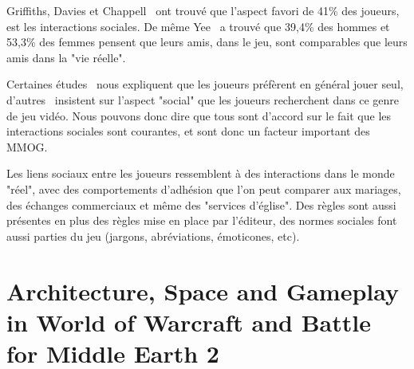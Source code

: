 \documentclass[11pt,a4paper]{article}
\begin{document}
Griffiths, Davies et Chappell~\cite{BreakingSteretype} ont trouvé que l'aspect favori de 41\% des joueurs, est les interactions sociales. De même Yee~\cite{1159988} a trouvé que 39,4\% des hommes et 53,3\% des femmes pensent que leurs amis, dans le jeu, sont comparables que leurs amis dans la "vie réelle". 
\par Certaines études~\cite{1124834,1031667} nous expliquent que les joueurs préfèrent en général jouer seul, d'autres~\cite{1159988,Jakobsson03thesopranos} insistent sur l'aspect "social" que les joueurs recherchent dans ce genre de jeu vidéo. Nous pouvons donc dire que tous sont d'accord sur le fait que les interactions sociales sont courantes, et sont donc un facteur important des MMOG. 
\par Les liens sociaux entre les joueurs ressemblent à des interactions dans le monde "réel", avec des comportements d'adhésion que l'on peut comparer aux mariages, des échanges commerciaux et même des "services d'église". Des règles sont aussi présentes en plus des règles mise en place par l'éditeur, des normes sociales font aussi parties du jeu (jargons, abréviations, émoticones, etc). 

\section{Architecture, Space and Gameplay in World of Warcraft and Battle for Middle Earth 2}



\newpage




 
\end{document}

